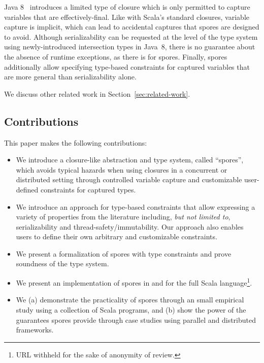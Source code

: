 \documentclass{llncs}
\newcommand{\sporeurl}{URL withheld for the sake of anonymity of review.}
\begin{document}
{Java 8}~\cite{JavaLambdas,JavaLambdaTranslation} introduces a limited type of
closure which is only permitted to capture variables that are
effectively-final. Like with Scala's standard closures, variable capture is
implicit, which can lead to accidental captures that spores are designed to
avoid. Although serializability can be requested at the level of the type
system using newly-introduced intersection types in \mbox{Java 8}, there is no
guarantee about the absence of runtime exceptions, as there is for spores.
Finally, spores additionally allow specifying type-based constraints for
captured variables that are more general than serializability alone.

We discuss other related work in Section~\ref{sec:related-work}.

\subsection{Contributions}

This paper makes the following contributions:
\vspace{-1.5mm}
\begin{itemize}
\item We introduce a closure-like abstraction and type system,  called
``spores'', which avoids typical hazards when using closures in a concurrent
or distributed setting through controlled variable capture and customizable
user-defined constraints for captured types.

\item We introduce an approach for type-based constraints that allow
expressing  a variety of properties from the literature including, {\em but
not limited to}, serializability and thread-safety/immutability. Our approach
also enables users to define their own arbitrary and customizable constraints.

\item We present a formalization of spores with type constraints and  prove
soundness of the type system.

\item We present an implementation of spores in and for the full Scala
language\footnote{\sporeurl}.

\item We (a) demonstrate the practicality of spores through an small
empirical study using a collection of Scala programs, and (b) show the power
of the guarantees spores provide through case studies using parallel and distributed frameworks.
\end{itemize}
\end{document}
